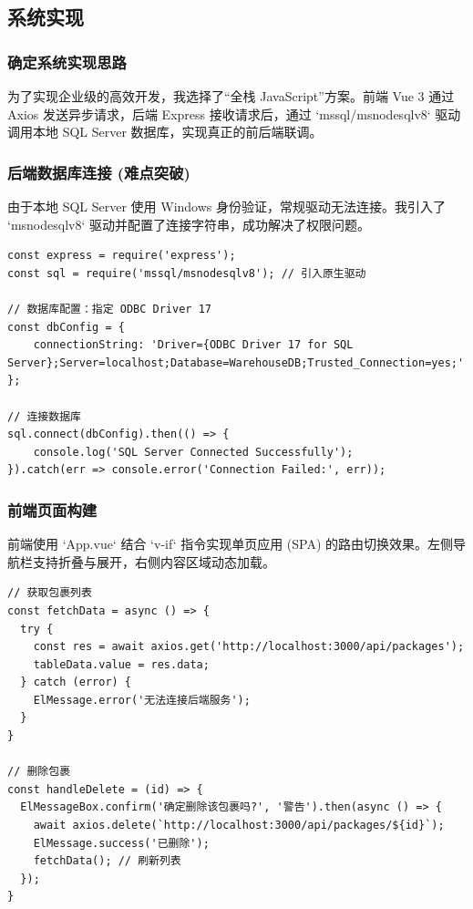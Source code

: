 \documentclass[UTF8, a4paper, 12pt]{ctexart}
\begin{document}
\subsection{系统实现}

\subsubsection{确定系统实现思路}
为了实现企业级的高效开发，我选择了“全栈 JavaScript”方案。前端 Vue 3 通过 Axios 发送异步请求，后端 Express 接收请求后，通过 `mssql/msnodesqlv8` 驱动调用本地 SQL Server 数据库，实现真正的前后端联调。

\subsubsection{后端数据库连接 (难点突破)}
由于本地 SQL Server 使用 Windows 身份验证，常规驱动无法连接。我引入了 `msnodesqlv8` 驱动并配置了连接字符串，成功解决了权限问题。

\begin{lstlisting}[caption={Node.js 连接 SQL Server 核心代码}]
const express = require('express');
const sql = require('mssql/msnodesqlv8'); // 引入原生驱动

// 数据库配置：指定 ODBC Driver 17
const dbConfig = {
    connectionString: 'Driver={ODBC Driver 17 for SQL Server};Server=localhost;Database=WarehouseDB;Trusted_Connection=yes;'
};

// 连接数据库
sql.connect(dbConfig).then(() => {
    console.log('SQL Server Connected Successfully');
}).catch(err => console.error('Connection Failed:', err));
\end{lstlisting}

\subsubsection{前端页面构建}
前端使用 `App.vue` 结合 `v-if` 指令实现单页应用 (SPA) 的路由切换效果。左侧导航栏支持折叠与展开，右侧内容区域动态加载。

\begin{lstlisting}[caption={前端 API 请求示例 (Axios)}]
// 获取包裹列表
const fetchData = async () => {
  try {
    const res = await axios.get('http://localhost:3000/api/packages');
    tableData.value = res.data;
  } catch (error) {
    ElMessage.error('无法连接后端服务');
  }
}

// 删除包裹
const handleDelete = (id) => {
  ElMessageBox.confirm('确定删除该包裹吗?', '警告').then(async () => {
    await axios.delete(`http://localhost:3000/api/packages/${id}`);
    ElMessage.success('已删除');
    fetchData(); // 刷新列表
  });
}
\end{lstlisting}
\end{document}
